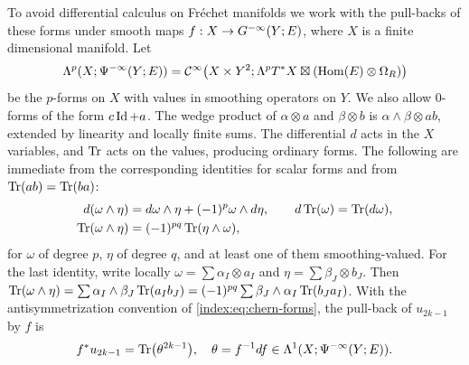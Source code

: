 To avoid differential calculus on Fr\'echet manifolds we work with the
pull-backs of these forms under smooth maps $f:X\to G^{-\infty}(Y;E)$, where $X$ is a
finite dimensional manifold. Let
\begin{equation*}
  \Lambda^p(X;\Psi^{-\infty}(Y;E))=\mathcal{C}^\infty\bigl(X\times Y^2;\Lambda^pT^*X\boxtimes
  (\operatorname{Hom}(E)\otimes\Omega_R)\bigr)
\end{equation*}
be the $p$-forms on $X$ with values in smoothing operators on $Y$. We also
allow $0$-forms of the form $c\operatorname{Id}+a$. The wedge product of
$\alpha\otimes a$ and $\beta\otimes b$ is $\alpha\wedge\beta\otimes ab$,
extended by linearity and locally finite sums. The differential $d$ acts in
the $X$ variables, and $\operatorname{Tr}$ acts on the values, producing ordinary forms. The
following are immediate from the corresponding identities for scalar forms
and from $\operatorname{Tr}(ab)=\operatorname{Tr}(ba)$:
\begin{equation}\label{index:eq:graded}
  \begin{aligned}
  d(\omega\wedge\eta)&=d\omega\wedge\eta+(-1)^p\omega\wedge d\eta,\qquad
  d\operatorname{Tr}(\omega)=\operatorname{Tr}(d\omega),\\
  \operatorname{Tr}(\omega\wedge\eta)&=(-1)^{pq}\operatorname{Tr}(\eta\wedge\omega),
  \end{aligned}
\end{equation}
for $\omega$ of degree $p$, $\eta$ of degree $q$, and at least one of them
smoothing-valued. For the last identity, write locally
$\omega=\sum\alpha_I\otimes a_I$ and $\eta=\sum\beta_J\otimes b_J$. Then
$\operatorname{Tr}(\omega\wedge\eta)=\sum\alpha_I\wedge\beta_J\operatorname{Tr}(a_Ib_J)
=(-1)^{pq}\sum\beta_J\wedge\alpha_I\operatorname{Tr}(b_Ja_I)$. With the antisymmetrization
convention of \eqref{index:eq:chern-forms}, the pull-back of $u_{2k-1}$ by $f$
is
\begin{equation*}
  f^*u_{2k-1}=\operatorname{Tr}\bigl(\theta^{2k-1}\bigr),\quad \theta=f^{-1}df\in
  \Lambda^1(X;\Psi^{-\infty}(Y;E)).
\end{equation*}

